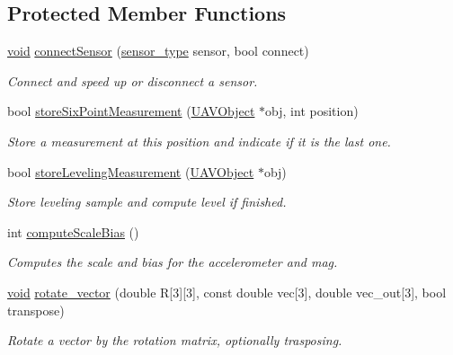 \subsection*{\-Protected \-Member \-Functions}
\begin{DoxyCompactItemize}
\item 
\hyperlink{group___u_a_v_objects_plugin_ga444cf2ff3f0ecbe028adce838d373f5c}{void} \hyperlink{class_calibration_a136ee34ff849bbeb76c30cd543e7419b}{connect\-Sensor} (\hyperlink{class_calibration_ab4af1e75c9a40776a4c5ed1da5e7caf8}{sensor\-\_\-type} sensor, bool connect)
\begin{DoxyCompactList}\small\item\em \-Connect and speed up or disconnect a sensor. \end{DoxyCompactList}\item 
bool \hyperlink{class_calibration_accd918a485a64e4d0f751050f84e660a}{store\-Six\-Point\-Measurement} (\hyperlink{class_u_a_v_object}{\-U\-A\-V\-Object} $\ast$obj, int position)
\begin{DoxyCompactList}\small\item\em \-Store a measurement at this position and indicate if it is the last one. \end{DoxyCompactList}\item 
bool \hyperlink{class_calibration_a2a04c8742b7da61b9b835b43d114fcd4}{store\-Leveling\-Measurement} (\hyperlink{class_u_a_v_object}{\-U\-A\-V\-Object} $\ast$obj)
\begin{DoxyCompactList}\small\item\em \-Store leveling sample and compute level if finished. \end{DoxyCompactList}\item 
int \hyperlink{class_calibration_aae10034ae031c64a977309fed00e7a91}{compute\-Scale\-Bias} ()
\begin{DoxyCompactList}\small\item\em \-Computes the scale and bias for the accelerometer and mag. \end{DoxyCompactList}\item 
\hyperlink{group___u_a_v_objects_plugin_ga444cf2ff3f0ecbe028adce838d373f5c}{void} \hyperlink{class_calibration_a5b519d85bb3e530d25b595bad5a926d7}{rotate\-\_\-vector} (double \-R\mbox{[}3\mbox{]}\mbox{[}3\mbox{]}, const double vec\mbox{[}3\mbox{]}, double vec\-\_\-out\mbox{[}3\mbox{]}, bool transpose)
\begin{DoxyCompactList}\small\item\em \-Rotate a vector by the rotation matrix, optionally trasposing. \end{DoxyCompactList}\item 

\end{DoxyCompactItemize}
